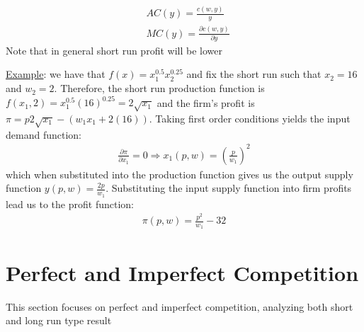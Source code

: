 \documentclass{article}
\begin{document}
  \begin{align*}
    & AC(y) = \frac{c(w,y)}{y} \\
    & MC(y) = \frac{\partial c(w,y)}{\partial y}
  \end{align*}
  Note that in general short run profit will be lower
  \par
  \underline{Example}: we have that $f(x) = x_{1}^{0.5}x_{2}^{0.25}$ and fix the short run such that $x_{2} = 16$ and $w_{2} = 2$. Therefore, the short run production function is $f(x_{1},2) = x_{1}^{0.5}(16)^{0.25} = 2 \sqrt{x_{1}}$ and the firm's profit is $\pi = p2\sqrt{x_{1}} - (w_{1}x_{1} + 2(16))$. Taking first order conditions yields the input demand function:
  \begin{gather*}
    \frac{\partial \pi}{\partial x_{1}} = 0 \Rightarrow x_{1}(p,w) = (\frac{p}{w_{1}})^{2}
  \end{gather*}
  which when substituted into the production function gives us the output supply function $y(p,w) = \tfrac{2p}{w_{1}}$. Substituting the input supply function into firm profits lead us to the profit function:
  \begin{gather*}
    \pi(p,w) = \frac{p^{2}}{w_{1}} - 32
  \end{gather*}

\newpage

\vspace{2.5mm}
\section{Perfect and Imperfect Competition}
This section focuses on perfect and imperfect competition, analyzing both short and long run type result
\vspace{6mm}
\end{document}
